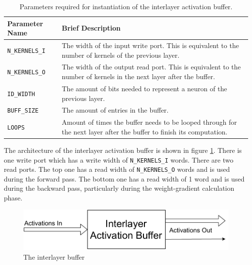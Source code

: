\begin{table}
	\centering
	\begin{tabularx}{\textwidth}{|l| X|}
		\hline
		\textbf{Parameter Name}	& \textbf{Brief Description}\\\hline
		\texttt{N\_KERNELS\_I} & 
		The width of the input write port. This is equivalent to the number of kernels of the previous layer. \\\hline
		
		\texttt{N\_KERNELS\_O} & 
		The width of the output read port. This is equivalent to the number of kernels in the next layer after the buffer.\\\hline
		
		\texttt{ID\_WIDTH} &
		The amount of bits needed to represent a neuron of the previous layer.\\\hline 
		
		\texttt{BUFF\_SIZE} &
		The amount of entries in the buffer. \\\hline 
		
		\texttt{LOOPS} &
		Amount of times the buffer needs to be looped through for the next layer after the buffer to finish its computation.
		\\\hline
	\end{tabularx}	
	\caption{Parameters required for instantiation of the interlayer activation buffer.}
	\label{interlayer-arch-params}
\end{table}

The architecture of the interlayer activation buffer is shown in figure \ref{interlayer-arch}. There is one write port which has a write width of \texttt{N\_KERNELS\_I} words. There are two read ports. The top one has a read width of \texttt{N\_KERNELS\_O} words and is used during the forward pass. The bottom one has a read width of 1 word and is used during the backward pass, particularly during the weight-gradient calculation phase.
\begin{figure}
	\centering 
	\includegraphics[width=\textwidth]{figures/interlayer_buffer}
	\caption{The interlayer buffer}\label{interlayer-arch}
\end{figure}

